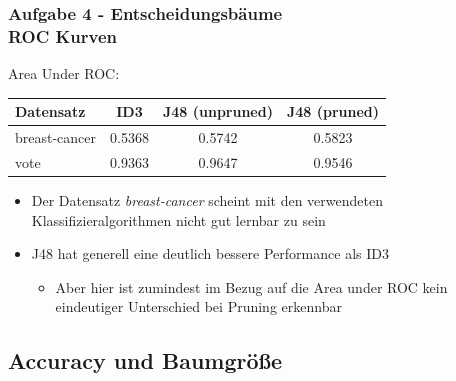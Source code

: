 \documentclass[accentcolor=tud6b,colorbacktitle,inverttitle,landscape,german,presentation,t]{tudbeamer}
\begin{document}
    \begin{frame}[t]
    \frametitle{Aufgabe 4 - Entscheidungsbäume\\ ROC Kurven}
        Area Under ROC:
        \vfill
        \begin{tabular}[htbp]{l||c|c|c}
            Datensatz & ID3 & J48 (unpruned) & J48 (pruned) \\
            \hline
            \hline
            breast-cancer & 0.5368 & 0.5742 & 0.5823 \\
            \hline
            vote & 0.9363 & 0.9647 & 0.9546 \\
        \end{tabular}
        \vfill
	\begin{itemize}
            \item Der Datensatz \textit{breast-cancer} scheint  mit den verwendeten Klassifizieralgorithmen nicht gut lernbar zu sein
            \item J48 hat generell eine deutlich bessere Performance als ID3 
\begin{itemize}	    
\item Aber hier ist zumindest im Bezug auf die Area under ROC kein eindeutiger Unterschied bei Pruning erkennbar
        \end{itemize}
        \end{itemize}
    \end{frame}
    
    \subsection{Accuracy und Baumgröße}
    
\end{document}
